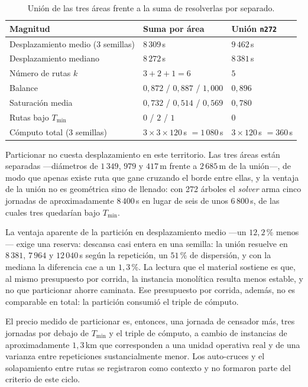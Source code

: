 \begin{table}[H]
  \centering
  \caption{Unión de las tres áreas frente a la suma de resolverlas por separado.}
  \label{tab:precio-particion}
  \begin{tabularx}{\textwidth}{lXX}
    \toprule
    Magnitud & Suma por área & Unión \texttt{n272} \\
    \midrule
    Desplazamiento medio (3 semillas) & $8\,309$\,s & $9\,462$\,s \\
    Desplazamiento mediano            & $8\,272$\,s & $8\,381$\,s \\
    Número de rutas $k$               & $3 + 2 + 1 = 6$ & $5$ \\
    Balance                           & $0{,}872$ / $0{,}887$ / $1{,}000$ & $0{,}896$ \\
    Saturación media                  & $0{,}732$ / $0{,}514$ / $0{,}569$ & $0{,}780$ \\
    Rutas bajo $T_{\min}$             & $0$ / $2$ / $1$ & $0$ \\
    Cómputo total (3 semillas)        & $3 \times 3 \times 120$\,s $= 1\,080$\,s & $3 \times 120$\,s $= 360$\,s \\
    \bottomrule
  \end{tabularx}
\end{table}

Particionar no cuesta desplazamiento en este territorio. Las tres áreas están
separadas ---diámetros de $1\,349$, $979$ y $417$\,m frente a $2\,685$\,m de la
unión---, de modo que apenas existe ruta que gane cruzando el borde entre ellas,
y la ventaja de la unión no es geométrica sino de llenado: con 272 árboles el
\textit{solver} arma cinco jornadas de aproximadamente $8\,400$\,s en lugar de
seis de unos $6\,800$\,s, de las cuales tres quedarían bajo $T_{\min}$.

La ventaja aparente de la partición en desplazamiento medio ---un $12{,}2$\,\%
menos--- exige una reserva: descansa casi entera en una semilla: la unión resuelve en $8\,381$, $7\,964$ y
$12\,040$\,s según la repetición, un $51$\,\% de dispersión, y con la mediana la
diferencia cae a un $1{,}3$\,\%. La lectura que el material sostiene es que, al
mismo presupuesto por corrida, la instancia monolítica resulta menos estable, y
no que particionar ahorre caminata. Ese presupuesto por corrida, además, no es
comparable en total: la partición consumió el triple de cómputo.

El precio medido de particionar es, entonces, una jornada de censador más, tres
jornadas por debajo de $T_{\min}$ y el triple de cómputo, a cambio de instancias
de aproximadamente $1{,}3$\,km que corresponden a una unidad operativa real y de
una varianza entre repeticiones sustancialmente menor. Los auto-cruces y el
solapamiento entre rutas se registraron como contexto y no formaron parte del
criterio de este ciclo.

